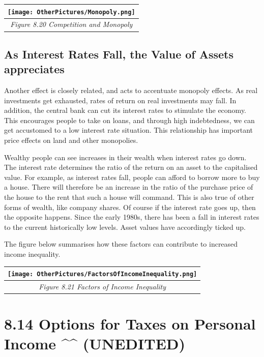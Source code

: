 \documentclass[]{tufte-handout}
\begin{document}
\begin{longtable}[]{@{}c@{}}
\toprule
\texttt{[image: OtherPictures/Monopoly.png]}\tabularnewline
\midrule
\endhead
\emph{Figure 8.20 Competition and Monopoly}\tabularnewline
\bottomrule
\end{longtable}

\hypertarget{as-interest-rates-fall-the-value-of-assets-appreciates}{%
\subsection{As Interest Rates Fall, the Value of Assets
appreciates}\label{as-interest-rates-fall-the-value-of-assets-appreciates}}

Another effect is closely related, and acts to accentuate monopoly
effects. As real investments get exhausted, rates of return on real
investments may fall. In addition, the central bank can cut its interest
rates to stimulate the economy. This encourages people to take on loans,
and through high indebtedness, we can get accustomed to a low interest
rate situation. This relationship has important price effects on land
and other monopolies.

Wealthy people can see increases in their wealth when interest rates go
down. The interest rate determines the ratio of the return on an asset
to the capitalised value. For example, as interest rates fall, people
can afford to borrow more to buy a house. There will therefore be an
increase in the ratio of the purchase price of the house to the rent
that such a house will command. This is also true of other forms of
wealth, like company shares. Of course if the interest rate goes up,
then the opposite happens. Since the early 1980s, there has been a fall
in interest rates to the current historically low levels. Asset values
have accordingly ticked up.

The figure below summarises how these factors can contribute to
increased income inequality.

\begin{longtable}[]{@{}c@{}}
\toprule
\texttt{[image: OtherPictures/FactorsOfIncomeInequality.png]}\tabularnewline
\midrule
\endhead
\emph{Figure 8.21 Factors of Income Inequality}\tabularnewline
\bottomrule
\end{longtable}

\hypertarget{options-for-taxes-on-personal-income-unedited}{%
\section{8.14 Options for Taxes on Personal Income \^{}\^{}
(UNEDITED)}\label{options-for-taxes-on-personal-income-unedited}}
\end{document}
